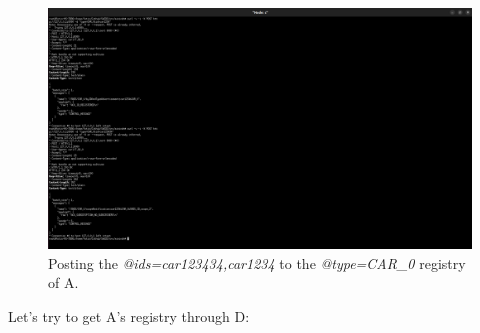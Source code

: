 \documentclass{article}
\begin{document}
\begin{figure}[H]
    \centering
    \includegraphics[width=1\linewidth]{images/post_to_registry_c_a.png}
    \caption{Posting the \textit{@ids=car123434,car1234} to the \textit{@type=CAR\_0} registry of A.}
    \label{fig:post_to_registry_c_a}
\end{figure}

Let's try to get A's registry through D: 
\end{document}

